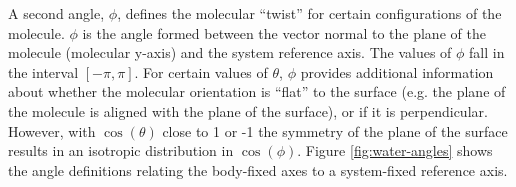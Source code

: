 	A second angle, $\phi$, defines the molecular ``twist'' for certain configurations of the molecule. $\phi$ is the angle formed between the vector normal to the plane of the molecule (molecular y-axis) and the system reference axis. The values of $\phi$ fall in the interval $[-\pi,\pi]$. For certain values of $\theta$, $\phi$ provides additional information about whether the molecular orientation is ``flat'' to the surface (e.g. the plane of the molecule is aligned with the plane of the surface), or if it is perpendicular. %
	However, with $\cos(\theta)$ close to 1 or -1 the symmetry of the plane of the surface results in an isotropic distribution in $\cos(\phi)$. Figure \ref{fig:water-angles} shows the angle definitions relating the body-fixed axes to a system-fixed reference axis. 


